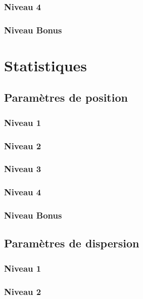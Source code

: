 \documentclass[a4paper]{report}
\begin{document}
			\subsection{Niveau 4}
			
			\subsection{Niveau Bonus}
	
	\chapter{Statistiques}
	
		\section{Paramètres de position}
		
			\subsection{Niveau 1}
		
			\subsection{Niveau 2}
		
			\subsection{Niveau 3}
			
			\subsection{Niveau 4}
			
			\subsection{Niveau Bonus}
		
		\section{Paramètres de dispersion}
		
			\subsection{Niveau 1}
		
			\subsection{Niveau 2}
		
\end{document}
